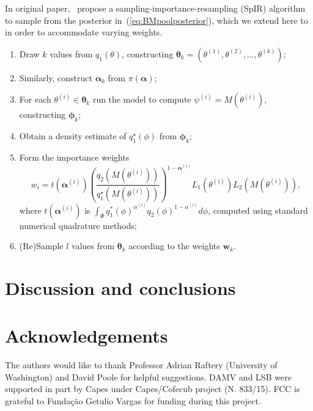 \documentclass[a4paper, notitlepage, 10pt]{article}
\begin{document}
In original paper,~\cite[sec. 3.4]{poole2000} propose a sampling-importance-resampling (SpIR) algorithm to sample from the posterior in~(\ref{eq:BMpoolposterior}), which we extend here to in order to accommodate varying weights.
\begin{enumerate}
 \item Draw $k$ values from  $q_1(\theta)$, constructing $\boldsymbol \theta_k = (\theta^{(1)}, \theta^{(2)}, \ldots, \theta^{(k)} )$;
 \item Similarly, construct $\boldsymbol \alpha_k$ from $\pi(\boldsymbol \alpha)$;
 \item For each $\theta^{(i)} \in \boldsymbol\theta_k$ run the model to compute $\psi^{(i)} = M(\theta^{(i)})$, constructing $\boldsymbol \phi_k$;
 \item Obtain a density estimate of $q_1^\star(\phi)$ from  $\boldsymbol \phi_k$;
 \item Form the importance weights 
 \begin{equation}
 \label{eq:SpIRweights}
  w_i = t(\boldsymbol \alpha^{(i)}) \left(\frac{q_2(M(\theta^{(i)}))}{q_1^\star(M(\theta^{(i)}))}\right)^{1 - \boldsymbol \alpha^{(i)}} L_1(\theta^{(i)}) L_2(M(\theta^{(i)})),
 \end{equation}
where $t(\boldsymbol \alpha^{(i)})$ is $\int_{\Phi} q_1^\ast(\phi)^{\alpha^{(i)}} q_2(\phi)^{1-\alpha^{(i)}} d\phi$, computed using standard numerical quadrature methods;
 \item (Re)Sample $l$ values from $\boldsymbol \theta_k$ according to the weights $\boldsymbol w_k$.
\end{enumerate}

\section{Discussion and conclusions}
\label{sec:discussion}


\section{Acknowledgements}
The authors would like to thank Professor Adrian Raftery (University of Washington) and David Poole for helpful suggestions.
DAMV and LSB were supported in part by Capes under Capes/Cofecub project (N. 833/15).
FCC is grateful to Funda\c{c}\~ao Getulio Vargas for funding during this 
project.

\end{document}
